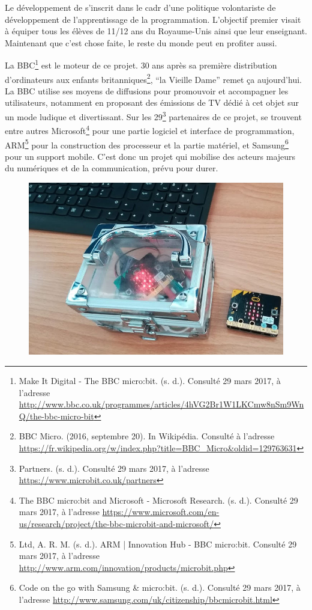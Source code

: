 Le développement de \mb s’inscrit dans le cadr d’une politique volontariste de développement de l’apprentissage de la programmation. L’objectif premier visait à équiper tous les élèves de 11/12 ans du Royaume-Unis ainsi que leur enseignant. Maintenant que c’est chose faite, le reste du monde peut en profiter aussi.


La BBC\footnote{Make It Digital - The BBC micro:bit. (s. d.). Consulté 29 mars 2017, à l’adresse \url{http://www.bbc.co.uk/programmes/articles/4hVG2Br1W1LKCmw8nSm9WnQ/the-bbc-micro-bit}} est le moteur de ce projet. 30 ans après sa première distribution d’ordinateurs aux enfants britanniques\footnote{BBC Micro. (2016, septembre 20). In Wikipédia. Consulté à l’adresse \url{https://fr.wikipedia.org/w/index.php?title=BBC_Micro&oldid=129763631}}, “la Vieille Dame” remet ça aujourd’hui. La BBC utilise ses moyens de diffusions pour promouvoir et accompagner les utilisateurs, notamment en proposant des émissions de TV dédié à cet objet sur un mode ludique et divertissant. Sur les 29\footnote{Partners. (s. d.). Consulté 29 mars 2017, à l’adresse \url{https://www.microbit.co.uk/partners}} partenaires de ce projet, se trouvent entre autres Microsoft\footnote{The BBC micro:bit and Microsoft - Microsoft Research. (s. d.). Consulté 29 mars 2017, à l’adresse \url{https://www.microsoft.com/en-us/research/project/the-bbc-microbit-and-microsoft/}} pour une partie logiciel et interface de programmation, ARM\footnote{Ltd, A. R. M. (s. d.). ARM | Innovation Hub - BBC micro:bit. Consulté 29 mars 2017, à l’adresse \url{http://www.arm.com/innovation/products/microbit.php}} pour la construction des processeur et la partie matériel, et Samsung\footnote{Code on the go with Samsung \& micro:bit. (s. d.). Consulté 29 mars 2017, à l’adresse \url{http://www.samsung.com/uk/citizenship/bbcmicrobit.html}} pour un support mobile. C’est donc un projet qui mobilise des acteurs majeurs du numériques et de la communication, prévu pour durer.

\begin{figure}
    \center
    \includegraphics[width=0.5\linewidth]{res/mb-ap-02}
\end{figure}


